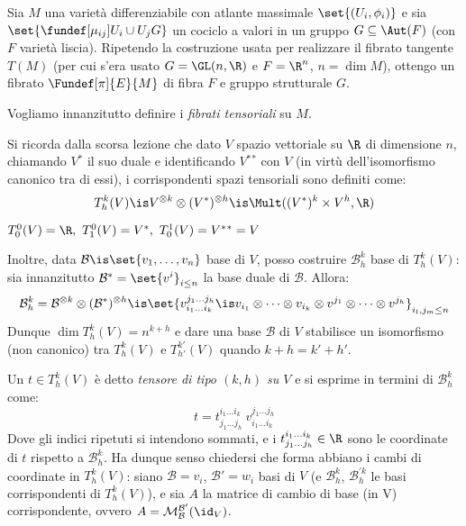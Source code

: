

\newcommand*\tc{\ \text{t.c.} \ } %
\newcommand*\dual{{^\ast}} %
\newcommand*\base[1][B]{\mathcal{#1}} %


Sia $M$ una varietà differenziabile con atlante massimale $\set{(U_i, \phi_i)}$ e sia $\set{ \fundef[\mu_{ij}]{U_i \cup U_j}{G} }$ un cociclo a valori in un gruppo $G \subseteq \Aut(F)$ (con $F$ varietà liscia). Ripetendo la costruzione usata per realizzare il fibrato tangente $T(M)$ (per cui s'era usato $G = \GL(n, \R)$ e $F=\R^n$, $n = \dim M$), ottengo un fibrato $\Fundef[\pi]{E}{M}$ di fibra $F$ e gruppo strutturale $G$.


Vogliamo innanzitutto definire i \emph{fibrati tensoriali} su $M$.

Si ricorda dalla scorsa lezione che dato $V$ spazio vettoriale su $\R$ di dimensione $n$, chiamando $V\dual$ il suo duale e identificando $V \dual \dual$ con $V$ (in virtù dell'isomorfismo canonico tra di essi), i corrispondenti spazi tensoriali sono definiti come: \[
T_h^k(V) \is V^{\otimes k} \otimes (V \dual)^{\otimes h} \is \Mult( (V\dual)^k \times V^h, \R)  \]
\begin{oss}
	$ T_0^0(V) = \R, \ T_1^0(V) = V \dual, \ T_0^1(V) = V \dual \dual = V $
\end{oss}	
Inoltre, data $\base \is \set{v_1, \dots, v_n}$ base di $V$, posso costruire $\base_h^k$ base di $T_h^k(V)$: sia innanzitutto $\base \dual = \set{v^i}_{i \leq n}$ la base duale di $\base$. Allora: \[
\base_h^k = \base ^{\otimes k} \otimes (\base \dual)^{\otimes h} \is
\set{v^{j_1 \dots j_h}_{i_1 \dots i_k} \is v_{i_1} \otimes \dots \otimes v_{i_k} \otimes v^{j_1} \otimes \dots \otimes v^{j_h} } _{i_l, j_m \leq n} \]
Dunque $\dim T_h^k(V) = n^{k+h}$ e dare una base $\base$ di $V$ stabilisce un isomorfismo (non canonico) tra $T_h^k(V)$ e $T_{h'}^{k'}(V)$ quando $k+h = k'+h'$.

Un $t \in T_h^k(V)$ è detto \emph{tensore di tipo $(k, h)$ su $V$} e si esprime in termini di $\base_h^k$ come: \[
t = t_{j_1 \dots j_h}^{i_1 \dots i_k} \  v^{j_1 \dots j_h}_{i_1 \dots i_k} \]
Dove gli indici ripetuti si intendono sommati, e i $t_{j_1 \dots j_h}^{i_1 \dots i_k} \in \R$ sono le coordinate di $t$ rispetto a $\base_h^k$. Ha dunque senso chiedersi che forma abbiano i cambi di coordinate in $T^k_h(V)$: siano $\base={v_i}$, $\base'={w_i}$ basi di $V$ (e $\base_h^k$, $\base_h^{\prime k}$ le basi corrispondenti di $T^k_h(V)$), e sia $A$ la matrice di cambio di base (in V) corrispondente, ovvero $A = \mathcal{M}_{\base}^{\base'}(\id_V)$.

